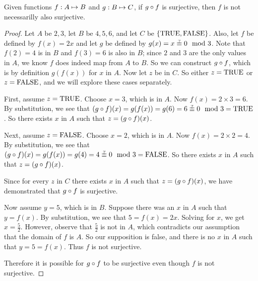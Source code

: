 \documentclass[main.tex]{subfiles}
\begin{document}
\begin{thm}
	Given functions \({f}: {A} \mapsto{} {B}\) and \({g}: {B} \mapsto{} {C}\), if
	\({g} \circ{} {f}\) is surjective, then \(f\) is not necessarilly also
	surjective.
\end{thm}
\begin{proof}
	Let \(A\) be \({2,3}\), let \(B\) be \({4,5,6}\), and let \(C\) be
	\(\{\mbox{TRUE},\mbox{FALSE}\}\). Also, let \(f\) be defined by \(f(x) = 2x\) and let \(g\)
	be defined by \(g(x) = \maybeeqmod{x}{0}{3}\). Note that \(f(2) = 4\) is
	in \(B\) and \(f(3) = 6\) is also in \(B\); since \(2\) and \(3\) are
	the only values in \(A\), we know \(f\) does indeed map from \(A\) to
	\(B\). So we can construct \({g} \circ{} {f}\), which is by definition
	\(g(f(x))\) for \(x\) in \(A\). Now let \(z\) be in \(C\). So either
	\(z = \mbox{TRUE}\) or \(z = \mbox{FALSE}\), and we will explore these cases
	separately.

	First, assume \(z = \mbox{TRUE}\). Choose \(x = 3\), which is in \(A\). Now
	\(f(x) = 2 \times 3 = 6\). By substitution, we see that
	\(\composeapply{g}{f}{x} = g(f(x)) = g(6) = \maybeeqmod{6}{0}{3} = \true\).
	So there exists \(x\) in \(A\) such that \(z = ({g} \circ{} {f})({x})\).

	Next, assume \(z = \mbox{FALSE}\). Choose \(x = 2\), which is in \(A\). Now
	\(f(x) = 2 \times 2 = 4\). By substitution, we see that
	\(\composeapply{g}{f}{x} = g(f(x)) = g(4) = \maybeeqmod{4}{0}{3} = \false\).
	So there exists \(x\) in \(A\) such that \(z = ({g} \circ{} {f})({x})\).

	Since for every \(z\) in \(C\) there exists \(x\) in \(A\) such that
	\(z = ({g} \circ{} {f})({x})\), we have demonstrated that
	\({g} \circ{} {f}\) is surjective.

	Now assume \(y = 5\), which is in \(B\). Suppose there was an \(x\) in
	\(A\) such that \(y = f(x)\). By substitution, we see that
	\(5 = f(x) = 2x\). Solving for \(x\), we get \(x = \frac{5}{2}\).
	However, observe that \(\frac{5}{2}\) is not in \(A\), which contradicts
	our assumption that the domain of \(f\) is \(A\). So our supposition is
	false, and there is no \(x\) in \(A\) such that \(y = 5 = f(x)\). Thus
	\(f\) is not surjective.

	Therefore it is possible for \({g} \circ{} {f}\) to be surjective even
	though \(f\) is not surjective.
\end{proof}
\end{document}
